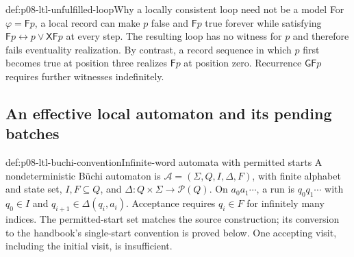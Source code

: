 \begin{hbexample}{def:p08-ltl-unfulfilled-loop}{Why a locally consistent loop need not be a model}
For \(\varphi=\mathsf Fp\), a local record can make
\(p\) false and \(\mathsf Fp\) true forever while satisfying
\(\mathsf Fp\leftrightarrow p\lor\mathsf X\mathsf Fp\)
at every step. The resulting loop has no witness for \(p\) and
therefore fails eventuality realization. By contrast, a record
sequence in which \(p\) first becomes true at position three
realizes \(\mathsf Fp\) at position zero. Recurrence
\(\mathsf G\mathsf Fp\) requires further witnesses indefinitely.
\end{hbexample}

\subsection{An effective local automaton and its pending batches}
\label{sec:p08-ltl-automaton-construction}

\begin{hbdefinition}{def:p08-ltl-buchi-convention}{Infinite-word automata with permitted starts}
A nondeterministic B\"uchi automaton is
\(\mathcal A=(\Sigma,Q,I,\Delta,F)\), with finite alphabet
and state set, \(I,F\subseteq Q\), and
\(\Delta:Q\times\Sigma\to\mathcal P(Q)\).
On \(a_0a_1\cdots\), a run is \(q_0q_1\cdots\) with
\(q_0\in I\) and \(q_{i+1}\in\Delta(q_i,a_i)\).
Acceptance requires \(q_i\in F\) for infinitely many indices.
The permitted-start set matches the source construction; its
conversion to the handbook's single-start convention is proved below.
One accepting visit, including the initial visit, is insufficient.
\end{hbdefinition}

